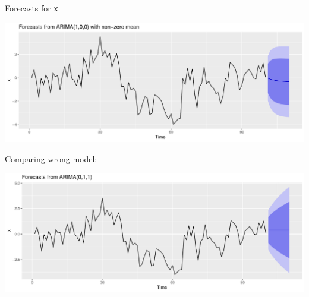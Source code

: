 \documentclass[
  ignorenonframetext,
]{beamer}
\newenvironment{Shaded}{\begin{snugshade}}{\end{snugshade}}
\newcommand{\KeywordTok}[1]{\textcolor[rgb]{0.13,0.29,0.53}{\textbf{#1}}}
\newcommand{\NormalTok}[1]{#1}
\newcommand{\OperatorTok}[1]{\textcolor[rgb]{0.81,0.36,0.00}{\textbf{#1}}}
\newcommand{\StringTok}[1]{\textcolor[rgb]{0.31,0.60,0.02}{#1}}
\begin{document}
\begin{frame}[fragile]{Forecasts for \texttt{x}}
\protect\hypertarget{forecasts-for-x}{}

\begin{Shaded}
\end{Shaded}

\includegraphics{slides_d29_files/figure-beamer/unnamed-chunk-570-1.pdf}

\end{frame}

\begin{frame}[fragile]{Comparing wrong model:}
\protect\hypertarget{comparing-wrong-model}{}

\begin{Shaded}
\end{Shaded}

\includegraphics{slides_d29_files/figure-beamer/unnamed-chunk-571-1.pdf}

\end{frame}
\end{document}
